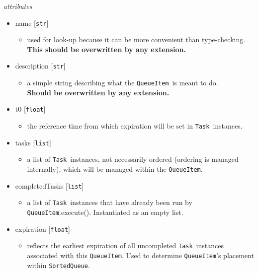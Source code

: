 \documentclass{article}
\newcommand{\SortedQueue}{\texttt{SortedQueue}}
\newcommand{\QueueItem}{\texttt{QueueItem}}
\newcommand{\Task}{\texttt{Task}}
\newcommand{\pythonfloat}{\texttt{float}}
\newcommand{\pythonstr}{\texttt{str}}
\newcommand{\pythonlist}{\texttt{list}}
\begin{document}
\vspace{0.5cm}
\noindent
\textit{attributes}

\begin{itemize}
    \item{name [\pythonstr]
        \begin{itemize}
            \item{used for look-up because it can be more convenient than type-checking. \\ \textbf{This should be overwritten by any extension.}}
        \end{itemize}
         }
    \item{description [\pythonstr]
        \begin{itemize}
            \item{a simple string describing what the \QueueItem~is meant to do. \\ \textbf{Should be overwritten by any extension.}}
        \end{itemize}
         }
    \item{t0 [\pythonfloat]
        \begin{itemize}
            \item{the reference time from which expiration will be set in \Task~instances.}
        \end{itemize}
         }
    \item{tasks [\pythonlist]
        \begin{itemize}
            \item{a list of \Task~instances, not necessarily ordered (ordering is managed internally), which will be managed within the \QueueItem.}
        \end{itemize}
         }
    \item{completedTasks [\pythonlist]
        \begin{itemize}
            \item{a list of \Task~instances that have already been run by \QueueItem.execute(). Instantiated as an empty list.}
        \end{itemize}
         }
    \item{expiration [\pythonfloat]
        \begin{itemize}
            \item{reflects the earliest expiration of all uncompleted \Task~instances associated with this \QueueItem. Used to determine \QueueItem's placement within \SortedQueue.}
        \end{itemize}
         }
\end{itemize}
\end{document}
